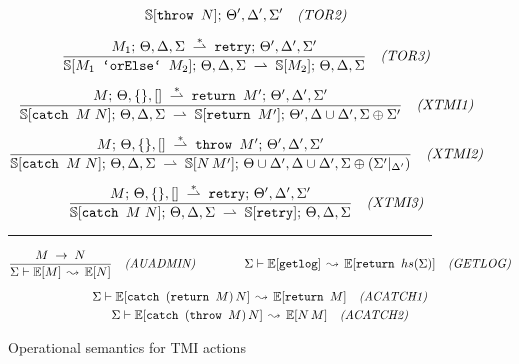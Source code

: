 \begin{figure*}
{\begin{minipage}{\textwidth}
\begin{gather*}
{      \SS[\prg{throw }N];\,\Theta',\Delta'\new{,\Sigma'}} 
    \quad\soslbl{TOR2}
\\[5pt]
\sos{M_1;\,\Theta,\Delta\new{,\Sigma} \stackrel{*}{\tddarrow} 
      \prg{retry};\,\Theta',\Delta'\new{,\Sigma'}}
      {\SS[M_1 \prg{ `orElse` } M_2];\,\Theta,\Delta\new{,\Sigma} \tddarrow 
      \SS[M_2];\,\Theta,\Delta\new{,\Sigma}} 
    \quad\soslbl{TOR3}
\\[5pt]
%
%
\sos{M;\,\Theta,\emptyset\new{,[]}
     \stackrel{*}{\tddarrow}
     \prg{return }M';\, \Theta', \Delta'\new{,\Sigma'}}
    {\SS[\prg{catch }M\;N];\,\Theta,\Delta\new{,\Sigma} \tddarrow
     \SS[\prg{return }M'];\, \Theta',\Delta\cup\Delta'\new{,\Sigma\oplus\Sigma'}}
    \quad\soslbl{XTMI1}
\\[5pt]
\sos{M;\,\Theta,\emptyset\new{,[]}
     \stackrel{*}{\tddarrow}
     \prg{throw }M';\, \Theta', \Delta'\new{, \Sigma'}}
    {\SS[\prg{catch }M\;N];\,\Theta,\Delta\new{,\Sigma} \tddarrow
     \SS[N \,M'];\, \Theta\cup\Delta',\Delta\cup\Delta'\new{,\Sigma\oplus(\Sigma'|_{\Delta'})}}
    \quad\soslbl{XTMI2}
\\[5pt]
\sos{M;\,\Theta,\emptyset\new{,[]}
     \stackrel{*}{\tddarrow}
     \prg{retry};\, \Theta', \Delta'\new{, \Sigma'}}
    {\SS[\prg{catch }M\;N];\,\Theta,\Delta\new{,\Sigma} \tddarrow
     \SS[\prg{retry}];\, \Theta,\Delta\new{,\Sigma}}
    \quad\soslbl{XTMI3}
\end{gather*}

\rule{0.95\linewidth}{0.5pt}

\begin{gather*}
\frac{M\;\rightarrow\; N}{\Sigma \vdash \mathbb{E}[M] \,\leadsto\, \mathbb{E}[N]}
\quad\textit{(AUADMIN)}
\qquad\qquad
\Sigma \vdash \mathbb{E}[\texttt{getlog}] \,\leadsto\, \mathbb{E}[\texttt{return } hs(\Sigma)]
\quad\textit{(GETLOG)}
\\[0.5em]
\Sigma \vdash \mathbb{E}[\texttt{catch }(\texttt{return }M)\, N]
    \,\leadsto\,
    \mathbb{E}[\texttt{return } M]
    \quad\textit{(ACATCH1)}
\\
\Sigma \vdash \mathbb{E}[\texttt{catch }(\texttt{throw }M)\, N]
    \,\leadsto\,
    \mathbb{E}[N\,M]
    \quad\textit{(ACATCH2)}
\end{gather*}

\end{minipage}}
\caption{Operational semantics for TMI actions}
\label{fig:sos2}
\end{figure*}
